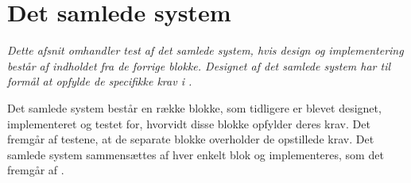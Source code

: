 \section{Det samlede system}\label{sec:samlet_system}
\textit{Dette afsnit omhandler test af det samlede system, hvis design og implementering består af indholdet fra de forrige blokke. Designet af det samlede system har til formål at opfylde de specifikke krav i .}

Det samlede system består en række blokke, som tidligere er blevet designet, implementeret og testet for, hvorvidt disse blokke opfylder deres krav. Det fremgår af testene, at de separate blokke overholder de opstillede krav. Det samlede system sammensættes af hver enkelt blok og implementeres, som det fremgår af .%

